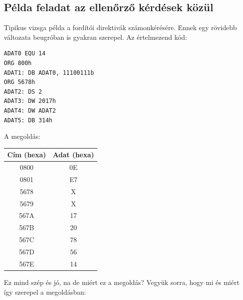\documentclass{article}
\begin{document}
\subsection{Példa feladat az ellenőrző kérdések közül}
Tipikus vizsga példa a fordítói direktivák számonkérésére. Ennek egy rövidebb változata beugróban is gyakran szerepel.
Az értelmezend kód:

\begin{lstlisting}[frame=single]
ADAT0 EQU 14
ORG 800h
ADAT1: DB ADAT0, 11100111b
ORG 5678h
ADAT2: DS 2
ADAT3: DW 2017h
ADAT4: DW ADAT2
ADAT5: DB 314h
\end{lstlisting}
A megoldás:

\begin{center}
\begin{tabular}{ |c|c| } 
 \hline
 Cím (hexa) & Adat (hexa) \\ \hline
 0800 & 0E \\ \hline
 0801 & E7 \\ \hline
 5678 & X \\ \hline
 5679 & X \\ \hline
 567A & 17 \\ \hline
 567B & 20 \\ \hline
 567C & 78 \\ \hline
 567D & 56 \\ \hline
 567E & 14 \\ \hline
 \hline
\end{tabular}
\end{center}
Ez mind szép és jó, na de miért ez a megoldás? Vegyük sorra, hogy mi és miért így szerepel a megoldásban:
\end{document}
